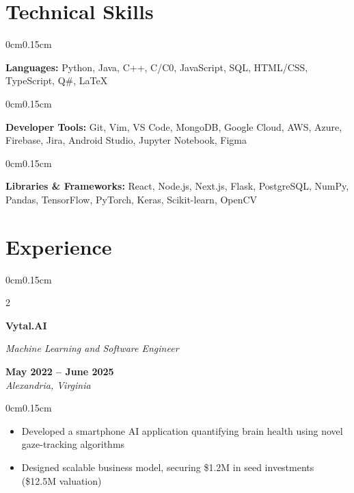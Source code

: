\documentclass[10pt, letterpaper]{article}
\newenvironment{highlights}{
    \begin{itemize}[topsep=0pt, parsep=0pt, partopsep=0pt, itemsep=0pt, leftmargin=0.6cm]
}{
    \end{itemize}
}
\newenvironment{onecolentry}{
    \begin{adjustwidth}{0cm}{0.15cm}
}{
    \end{adjustwidth}
}
\newenvironment{twocolentry}[2][]{
    \onecolentry
    \def\secondColumn{#2}
    \setcolumnwidth{\fill, 4cm}
    \begin{paracol}{2}
}{
    \switchcolumn \raggedleft \secondColumn
    \end{paracol}
    \endonecolentry
}
\begin{document}
    \vspace{0.05cm}

    \section{Technical Skills}
    \vspace{0.1cm}

    \begin{onecolentry}
        \textbf{Languages:} Python, Java, C++, C/C0, JavaScript, SQL, HTML/CSS, TypeScript, Q\#, LaTeX
    \end{onecolentry}

    \begin{onecolentry}
        \textbf{Developer Tools:} Git, Vim, VS Code, MongoDB, Google Cloud, AWS, Azure, Firebase, Jira, Android Studio, Jupyter Notebook, Figma
    \end{onecolentry}

    \begin{onecolentry}
        \textbf{Libraries \& Frameworks:} React, Node.js, Next.js, Flask, PostgreSQL, NumPy, Pandas, TensorFlow, PyTorch, Keras, Scikit-learn, OpenCV
    \end{onecolentry}

    \vspace{0.05cm}
    \section{Experience}
    \vspace{0.1cm}

    \begin{twocolentry}{\textbf{May 2022 -- June 2025} \\ \textit{Alexandria, Virginia}}
        \textbf{Vytal.AI}
        
        \textit{Machine Learning and Software Engineer}
    \end{twocolentry}

    \begin{onecolentry}
        \begin{highlights}
            \item Developed a smartphone AI application quantifying brain health using novel gaze-tracking algorithms
            \item Designed scalable business model, securing \$1.2M in seed investments (\$12.5M valuation)
        \end{highlights}
    \end{onecolentry}
\end{document}
